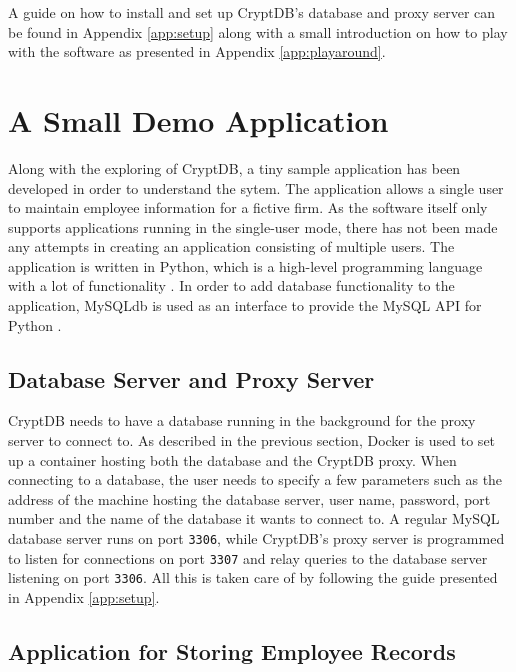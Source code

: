 A guide on how to install and set up CryptDB's database and proxy server can be found in Appendix \ref{app:setup} along with a small introduction on how to play with the software as presented in Appendix \ref{app:playaround}.


\section{A Small Demo Application}

Along with the exploring of CryptDB, a tiny sample application has been developed in order to understand the sytem. The application allows a single user to maintain employee information for a fictive firm. As the software itself only supports applications running in the single-user mode, there has not been made any attempts in creating an application consisting of multiple users. The application is written in Python, which is a high-level programming language with a lot of functionality \cite{python}. In order to add database functionality to the application, MySQLdb is used as an interface to provide the MySQL API for Python \cite{mysqldb}.

\subsection{Database Server and Proxy Server}

CryptDB needs to have a database running in the background for the proxy server to connect to. As described in the previous section, Docker is used to set up a container hosting both the database and the CryptDB proxy. When connecting to a database, the user needs to specify a few parameters such as the address of the machine hosting the database server, user name, password, port number and the name of the database it wants to connect to. A regular MySQL database server runs on port \verb!3306!, while CryptDB's proxy server is programmed to listen for connections on port \verb!3307! and relay queries to the database server listening on port \verb!3306!. All this is taken care of by following the guide presented in Appendix \ref{app:setup}.

\subsection{Application for Storing Employee Records}

